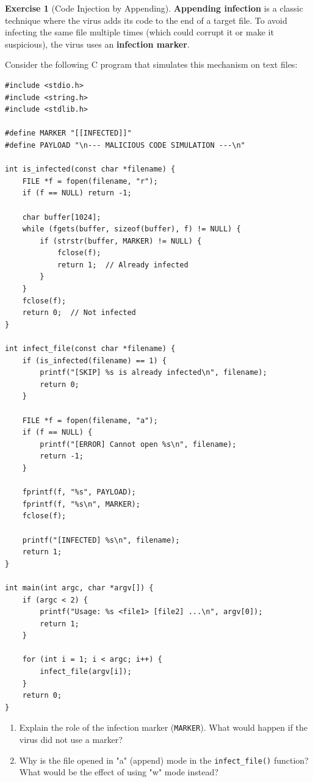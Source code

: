 \documentclass[a4paper,11pt]{article}
\theoremstyle{plain}
\theoremstyle{definition}
\newtheorem{exercice}{Exercise}
\begin{document}
\begin{exercice}[Code Injection by Appending]

\textbf{Appending infection} is a classic technique where the virus adds its code to the end of a target file. To avoid infecting the same file multiple times (which could corrupt it or make it suspicious), the virus uses an \textbf{infection marker}.

Consider the following C program that simulates this mechanism on text files:

\begin{verbatim}
#include <stdio.h>
#include <string.h>
#include <stdlib.h>

#define MARKER "[[INFECTED]]"
#define PAYLOAD "\n--- MALICIOUS CODE SIMULATION ---\n"

int is_infected(const char *filename) {
    FILE *f = fopen(filename, "r");
    if (f == NULL) return -1;

    char buffer[1024];
    while (fgets(buffer, sizeof(buffer), f) != NULL) {
        if (strstr(buffer, MARKER) != NULL) {
            fclose(f);
            return 1;  // Already infected
        }
    }
    fclose(f);
    return 0;  // Not infected
}

int infect_file(const char *filename) {
    if (is_infected(filename) == 1) {
        printf("[SKIP] %s is already infected\n", filename);
        return 0;
    }

    FILE *f = fopen(filename, "a");
    if (f == NULL) {
        printf("[ERROR] Cannot open %s\n", filename);
        return -1;
    }

    fprintf(f, "%s", PAYLOAD);
    fprintf(f, "%s\n", MARKER);
    fclose(f);

    printf("[INFECTED] %s\n", filename);
    return 1;
}

int main(int argc, char *argv[]) {
    if (argc < 2) {
        printf("Usage: %s <file1> [file2] ...\n", argv[0]);
        return 1;
    }

    for (int i = 1; i < argc; i++) {
        infect_file(argv[i]);
    }
    return 0;
}
\end{verbatim}

\begin{enumerate}
\item Explain the role of the infection marker (\texttt{MARKER}). What would happen if the virus did not use a marker?

\item Why is the file opened in "a" (append) mode in the \texttt{infect\_file()} function? What would be the effect of using "w" mode instead?


\end{enumerate}
\end{exercice}
\end{document}
